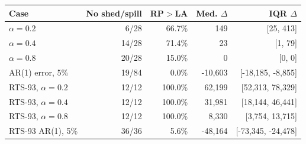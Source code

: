 \begin{tabular}{lrrrr}
\toprule
Case & No shed/spill & RP$>$LA & Med. $\Delta$ & IQR $\Delta$ \\
\midrule
$\alpha=0.2$ & 6/28 & 66.7\% & 149 & [25, 413] \\
$\alpha=0.4$ & 14/28 & 71.4\% & 23 & [1, 79] \\
$\alpha=0.8$ & 20/28 & 15.0\% & 0 & [0, 0] \\
AR(1) error, 5\% & 19/84 & 0.0\% & -10,603 & [-18,185, -8,855] \\
RTS-93, $\alpha=0.2$ & 12/12 & 100.0\% & 62,199 & [52,313, 78,329] \\
RTS-93, $\alpha=0.4$ & 12/12 & 100.0\% & 31,981 & [18,144, 46,441] \\
RTS-93, $\alpha=0.8$ & 12/12 & 100.0\% & 8,330 & [3,754, 13,715] \\
RTS-93 AR(1), 5\% & 36/36 & 5.6\% & -48,164 & [-73,345, -24,478] \\
\bottomrule
\end{tabular}
